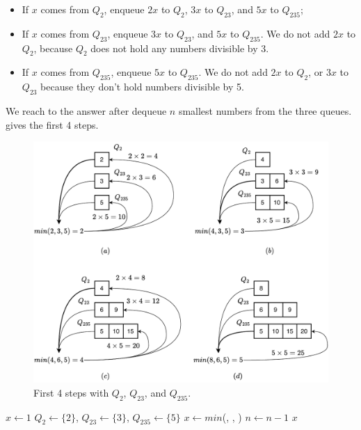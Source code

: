 \documentclass[b5paper]{article}
\begin{document}
\begin{itemize}
\item If $x$ comes from $Q_2$, enqueue $2x$ to $Q_2$, $3x$ to $Q_{23}$, and $5x$ to $Q_{235}$;
\item If $x$ comes from $Q_{23}$, enqueue $3x$ to $Q_{23}$, and $5x$ to $Q_{235}$. We do not add $2x$ to $Q_2$, because $Q_2$ does not hold any numbers divisible by 3.
\item If $x$ comes from $Q_{235}$, enqueue $5x$ to $Q_{235}$. We do not add $2x$ to $Q_2$, or $3x$ to $Q_{23}$ because they don't hold numbers divisible by 5.
\end{itemize}

We reach to the answer after dequeue $n$ smallest numbers from the three queues.  gives the first 4 steps.

\begin{figure}[htbp]
  \centering
  \includegraphics[scale=0.5]{img/q235}
  \caption{First 4 steps with $Q_2$, $Q_{23}$, and $Q_{235}$.}
  \label{fig:q235}
\end{figure}

\begin{algorithmic}[1]
  \State $x \gets 1$
  \State $Q_2 \gets \{ 2 \}$, $Q_{23} \gets \{ 3 \}$, $Q_{235} \gets \{ 5 \}$
    \State $x \gets min$(, , )
      \State {}
      \State {}
      \State {}
      \State {}
      \State {}
      \State {}
      \State {}
    \Else
      \State {}
      \State {}
    \EndIf
    \State $n \gets n - 1$
  \EndWhile
  \State \Return $x$
\EndFunction
\end{algorithmic}
\end{document}
